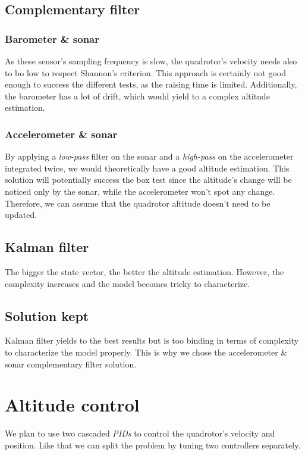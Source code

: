 \documentclass{repMobRob}
\begin{document}
\subsection{Complementary filter}
\subsubsection{Barometer \& sonar}
As these sensor's sampling frequency is slow, the quadrotor's velocity needs also to bo low to respect Shannon's criterion. This approach is certainly not good enough to success the different tests, as the raising time is limited. Additionally, the barometer has a lot of drift, which would yield to a complex altitude estimation.

\subsubsection{Accelerometer \& sonar}
By applying a \emph{low-pass} filter on the sonar and a \emph{high-pass} on the accelerometer integrated twice, we would theoretically have a good altitude estimation. This solution will potentially success the box test since the altitude's change will be noticed only by the sonar, while the accelerometer won't spot any change. Therefore, we can assume that the quadrotor altitude doesn't need to be updated.

\subsection{Kalman filter}
The bigger the state vector, the better the altitude estimation. However, the complexity increases and the model becomes tricky to characterize. 

\subsection{Solution kept}
Kalman filter yields to the best results but is too binding in terms of complexity to characterize the model properly. This is why we chose the accelerometer \& sonar complementary filter solution. 

\section{Altitude control}
We plan to use two cascaded \emph{PIDs} to control the quadrotor's velocity and position. Like that we can split the problem by tuning two controllers separately.
\end{document}
